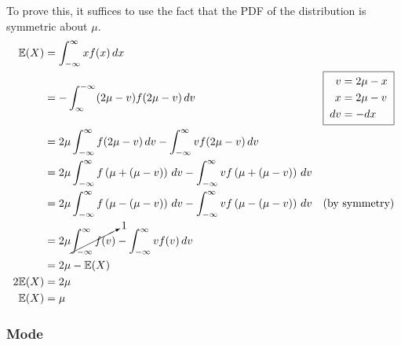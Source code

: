 \documentclass[titlepage,12 pt]{article}
\newcommand{\E}{\mathbb{E}}
\begin{document}
To prove this, it suffices to use the fact that the PDF of the distribution is symmetric about $\mu$.
\begin{align*}
    \E(X) & = \int_{-\infty}^{\infty} xf(x) \, dx \\
          & = -\int_{\infty}^{-\infty} (2\mu - v)f(2\mu - v) \, dv & \boxed{
              \begin{aligned}
                  v & = 2\mu - x \; \\
                  x & = 2\mu - v \\
                  \; dv & = -dx
              \end{aligned}
          } \\
          & = 2\mu \int_{-\infty}^{\infty} f(2\mu - v) \, dv - \int_{-\infty}^{\infty} vf(2\mu - v) \, dv \\
          & = 2\mu \int_{-\infty}^{\infty} f\left(\mu + (\mu - v)\right) \, dv
          - \int_{-\infty}^{\infty} vf\left(\mu + (\mu - v)\right) \, dv \\
          & = 2\mu \int_{-\infty}^{\infty} f\left(\mu - (\mu - v)\right) \, dv
          - \int_{-\infty}^{\infty} vf\left(\mu - (\mu - v)\right) \, dv & \text{(by symmetry)} \\
          & = 2\mu \cancelto{1}{\int_{-\infty}^{\infty} f(v)} - \int_{-\infty}^{\infty} vf(v) \, dv \\
          & = 2\mu - \E(X) \\
    2\E(X) & = 2\mu \\
    \E(X) & = \mu
\end{align*}

\subsubsection{Mode}
\end{document}
